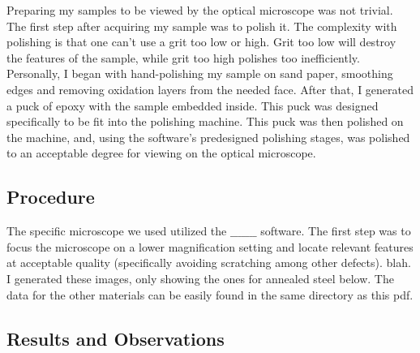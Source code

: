 \documentclass{article}
\begin{document}
Preparing my samples to be viewed by the optical microscope was not trivial. The first step after acquiring my sample was to polish it. The complexity with polishing is that one can't use a grit too low or high. Grit too low will destroy the features of the sample, while grit too high polishes too inefficiently. Personally, I began with hand-polishing my sample on sand paper, smoothing edges and removing oxidation layers from the needed face. After that, I generated a puck of epoxy with the sample embedded inside. This puck was designed specifically to be fit into the polishing machine. This puck was then polished on the machine, and, using the software's predesigned polishing stages, was polished to an acceptable degree for viewing on the optical microscope.

\subsection{Procedure}

The specific microscope we used utilized the $\textbf{\_\_\_\_\_\_\_}$ software. The first step was to focus the microscope on a lower magnification setting and locate relevant features at acceptable quality (specifically avoiding scratching among other defects). blah. I generated these images, only showing the ones for annealed steel below. The data for the other materials can be easily found in the same directory as this pdf.

\subsection{Results and Observations}
\end{document}
